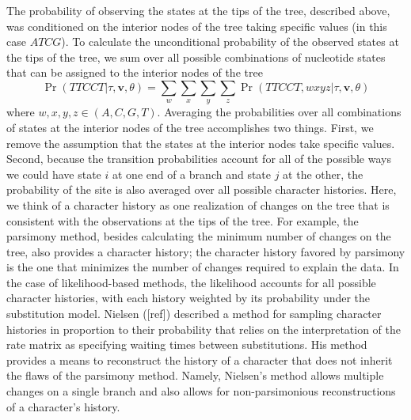 \documentclass{svmult}
\begin{document}
The probability of observing the states at the tips of the tree, described above, was conditioned on the interior nodes
of the tree taking specific values (in this case $ATCG$). To calculate the unconditional probability of the observed states
at the tips of the tree, we sum over all possible combinations of nucleotide states that can be assigned to the interior nodes
of the tree
$$
\Pr(TTCCT | \tau, {\mathbf v}, \theta ) = \sum_{w} \sum_{x} \sum_{y} \sum_{z} 
\Pr(TTCCT , w x y z | \tau, {\mathbf v}, \theta )
$$
where $w,x,y,z \in  (A,C,G,T)$. Averaging the probabilities over all combinations of states at the interior nodes of the
tree accomplishes two things. First, we remove the assumption that the states at the interior nodes take specific
values. Second, because the transition probabilities account for all of the possible ways we could have state $i$ at
one end of a branch and state $j$ at the other, the probability of the site is also averaged over all possible character
histories. Here, we think of a character history as one realization of changes on the tree that is consistent with the
observations at the tips of the tree. For example, the parsimony method, besides calculating the minimum number of
changes on the tree, also provides a character history; the character history favored by parsimony is the one that minimizes the number of changes
required to explain the data. In the case of likelihood-based methods, the likelihood accounts for all possible character histories,
with each history weighted by its probability under the substitution model. Nielsen ([ref]) described a method for sampling
character histories in proportion to their probability that relies on the interpretation of the rate matrix as specifying waiting
times between substitutions. His method provides a means to reconstruct the history of a character
that does not inherit the flaws of the parsimony method. Namely, Nielsen's method allows multiple changes on a single
branch and also allows for non-parsimonious reconstructions of a character's history.
\end{document}
